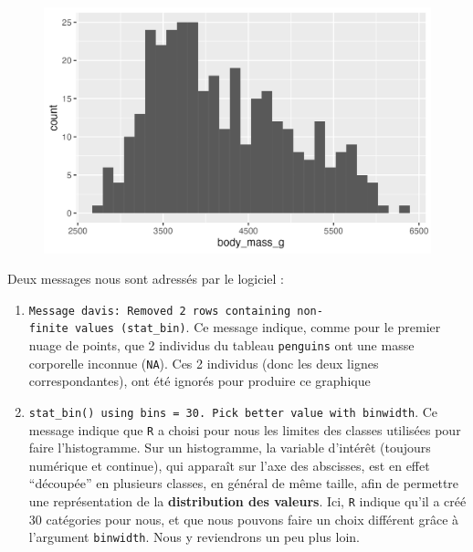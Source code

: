 \documentclass[
  letterpaper,
  DIV=11,
  numbers=noendperiod]{scrreprt}
\providecommand{\tightlist}{%
  \setlength{\itemsep}{0pt}\setlength{\parskip}{0pt}}\usepackage{longtable,booktabs,array}
\begin{document}
\begin{figure}[H]

{\centering \includegraphics{./03-visualization_files/figure-pdf/unnamed-chunk-8-1.png}

}

\end{figure}

Deux messages nous sont adressés par le logiciel :

\begin{enumerate}
\def\labelenumi{\arabic{enumi}.}
\tightlist
\item
  \texttt{Message\ d\textquotesingle{}avis:\ Removed\ 2\ rows\ containing\ non-finite\ values\ (stat\_bin)}.
  Ce message indique, comme pour le premier nuage de points, que 2
  individus du tableau \texttt{penguins} ont une masse corporelle
  inconnue (\texttt{NA}). Ces 2 individus (donc les deux lignes
  correspondantes), ont été ignorés pour produire ce graphique
\item
  \texttt{\textquotesingle{}stat\_bin()\textquotesingle{}\ using\ \textquotesingle{}bins\ =\ 30\textquotesingle{}.\ Pick\ better\ value\ with\ \textquotesingle{}binwidth\textquotesingle{}}.
  Ce message indique que \texttt{R} a choisi pour nous les limites des
  classes utilisées pour faire l'histogramme. Sur un histogramme, la
  variable d'intérêt (toujours numérique et continue), qui apparaît sur
  l'axe des abscisses, est en effet ``découpée'' en plusieurs classes,
  en général de même taille, afin de permettre une représentation de la
  \textbf{distribution des valeurs}. Ici, \texttt{R} indique qu'il a
  créé 30 catégories pour nous, et que nous pouvons faire un choix
  différent grâce à l'argument \texttt{binwidth}. Nous y reviendrons un
  peu plus loin.
\end{enumerate}
\end{document}
